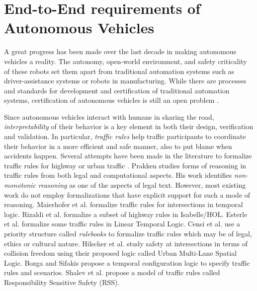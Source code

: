 \section{End-to-End requirements of Autonomous Vehicles}

A great progress has been made over the last decade in making autonomous vehicles a reality.
%
The autonomy, open-world environment, and safety criticality of these robots set them apart from traditional automation systems such as driver-assistance systems or robots in manufacturing.
%
While there are processes and standards for development and certification of traditional automation systems, certification of autonomous vehicles is still an open problem \cite{Zhao.2022}.



Since autonomous vehicles interact with humans in sharing the road, \emph{interpretability} of their behavior is a key element in both their design, verification and validation.
%
In particular, \emph{traffic rules} help traffic participants to coordinate their behavior in a more efficient and safe manner, also to put blame when accidents happen.
%
Several attempts have been made in the literature to formalize traffic rules for highway or urban traffic \cite{Bin.2022,arechiga2019specifying,Corso.2020,Esterle.2020,Maierhofer.2020,Hekmatnejad.2019,Cho.2019,Sahin.2020,Censi.2019}.
%
Prakken \cite{Prakken.2017} studies forms of reasoning in traffic rules from both legal and computational aspects.
%
His work identifies \emph{non-monotonic reasoning} as one of the aspects of legal text.
%
However, most existing work do not employ formalizations that have explicit support for such a mode of reasoning.
%
Maierhofer et al. \cite{Maierhofer.2022} formalize traffic rules for intersections in temporal logic.
%
Rizaldi et al. \cite{Rizaldi.2015,Rizaldi.2017} formalize a subset of highway rules in Isabelle/HOL.
%
Esterle et al. \cite{Esterle.2019,Esterle.2020} formalize some traffic rules in Linear Temporal Logic.
%
Censi et al. \cite{Censi.2019} use a priority structure called \emph{rulebooks} to formalize traffic rules which may be of legal, ethics or cultural nature.
%
Hilscher et al. \cite{Hilscher.2016} study safety at intersections in terms of collision freedom using their proposed logic called Urban Multi-Lane Spatial Logic.
%
Bozga and Sifakis \cite{Bozga.2021} propose a temporal configuration logic to specify traffic rules and scenarios.
%
Shalev et al. \cite{Shalev.2017} propose a model of traffic rules called Responsibility Sensitive Safety (RSS).


